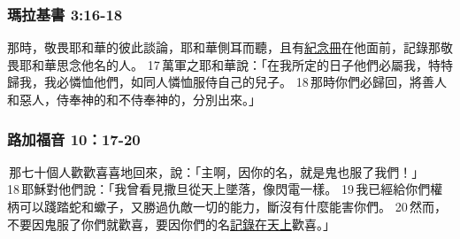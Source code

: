 \subsubsection{瑪拉基書 3:16-18}
那時，敬畏耶和華的彼此談論，耶和華側耳而聽，且有\underline{紀念冊}在他面前，記錄那敬畏耶和華思念他名的人。 17 萬軍之耶和華說：「在我所定的日子他們必屬我，特特歸我，我必憐恤他們，如同人憐恤服侍自己的兒子。 18 那時你們必歸回，將善人和惡人，侍奉神的和不侍奉神的，分別出來。」

\subsubsection{路加福音 10：17-20}
 那七十個人歡歡喜喜地回來，說：「主啊，因你的名，就是鬼也服了我們！」 18 耶穌對他們說：「我曾看見撒旦從天上墜落，像閃電一樣。 19 我已經給你們權柄可以踐踏蛇和蠍子，又勝過仇敵一切的能力，斷沒有什麼能害你們。 20 然而，不要因鬼服了你們就歡喜，要因你們的名\underline{記錄在天上}歡喜。」

